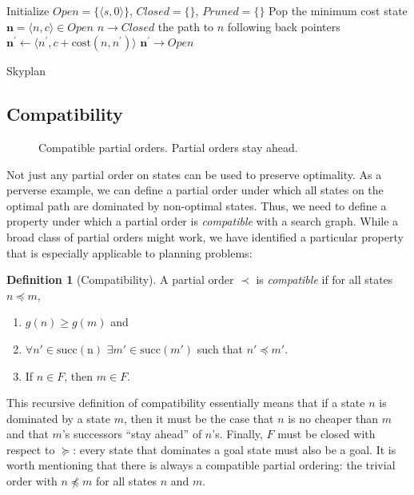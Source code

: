 \documentclass[letterpaper]{article}
\theoremstyle{plain} \newtheorem{theorem}{Theorem} \newtheorem{proposition}{Proposition} \newtheorem{lemma}{Lemma}
\theoremstyle{definition} \newtheorem{definition}{Definition} \newtheorem{conjecture}{Conjecture} \newtheorem*{example}{Example}
\theoremstyle{remark} \newtheorem*{remark}{Remark} \newtheorem*{note}{Note} \newtheorem{case}{Case}
\begin{document}
\begin{algorithm}
  \begin{algorithmic}[1]
    \State Initialize $Open=\{\langle s,0\rangle\}$, $Closed=\{\}$, $Pruned=\{\}$
    \State Pop the minimum cost state $\mathbf{n} = \langle n,c\rangle\in Open$
      \State $n\rightarrow Closed$
        \State \Return the path to $n$ following back pointers
      \EndIf
      \State $\mathbf{n^\prime} \gets \langle n^\prime,c+\mathrm{cost}(n,n^\prime)\rangle$
        \State $\mathbf{n^\prime} \rightarrow Open$
        \EndIf
      \EndFor
    \EndWhile
  \EndProcedure
  \end{algorithmic}
\caption{Skyplan}
\label{alg:skyplan}
\end{algorithm}

\subsection{Compatibility}
\begin{figure}
  \caption{Compatible partial orders. Partial orders stay ahead.}
\end{figure}

Not just any partial order on states can be used to preserve optimality. As a perverse
example, we can define a partial order under which all states on the optimal path
are dominated by non-optimal states. Thus, we need to define a property
under which a partial order is \textit{compatible} with a search graph. While
a broad class of partial orders might work, we have identified a particular 
property that is especially applicable to planning problems:

\begin{definition}[Compatibility]
	\label{def-compatibility}
  A partial order $\prec$ is \textit{compatible} if for all states $n \preceq m$,
  \begin{enumerate}
    \item $g(n) \ge g(m)$ and 
    \item $\forall n' \in \mathrm{succ(n)}$ $\exists m' \in \mathrm{succ}(m')$ such that $n' \preceq m'$.
    \item If $n \in F$, then $m \in F$.
  \end{enumerate}
\end{definition}
This recursive definition of compatibility essentially means that if a state $n$
is dominated by a state $m$, then it must be the case that $n$ is no cheaper than $m$
and that $m$'s successors ``stay ahead'' of $n$'s. Finally, $F$ must be closed with respect to $\succeq$: every state that
dominates a goal state must also be a goal. It is worth mentioning that
there is always a compatible partial ordering: the trivial order with $n \npreceq m$ for all
states $n$ and $m$.
\end{document}

